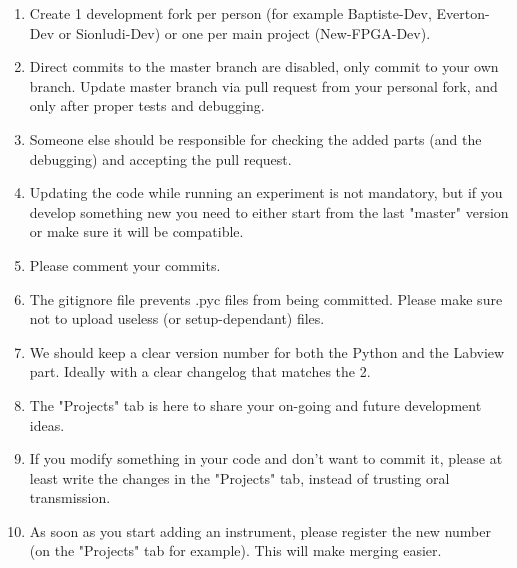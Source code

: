 \documentclass[a4paper,8pt]{article}
\begin{document}
\begin{enumerate}
\item Create 1 development fork per person (for example Baptiste-Dev, Everton-Dev or Sionludi-Dev) or one per main project (New-FPGA-Dev).

\item Direct commits to the master branch are disabled, only commit to your own branch. Update master branch via pull request from your personal fork, and only after proper tests and debugging.

\item Someone else should be responsible for checking the added parts (and the debugging) and accepting the pull request.

\item Updating the code while running an experiment is not mandatory, but if you develop something new you need to either start from the last "master" version or make sure it will be compatible.

\item Please comment your commits.

\item The gitignore file prevents .pyc files from being committed. Please make sure not to upload useless (or setup-dependant) files.

\item We should keep a clear version number for both the Python and the Labview part. Ideally with a clear changelog that matches the 2.

\item The "Projects" tab is here to share your on-going and future development ideas.

\item If you modify something in your code and don't want to commit it, please at least write the changes in the "Projects" tab, instead of trusting oral transmission.

\item As soon as you start adding an instrument, please register the new number (on the "Projects" tab for example). This will make merging easier.
\end{enumerate}
\end{document}
